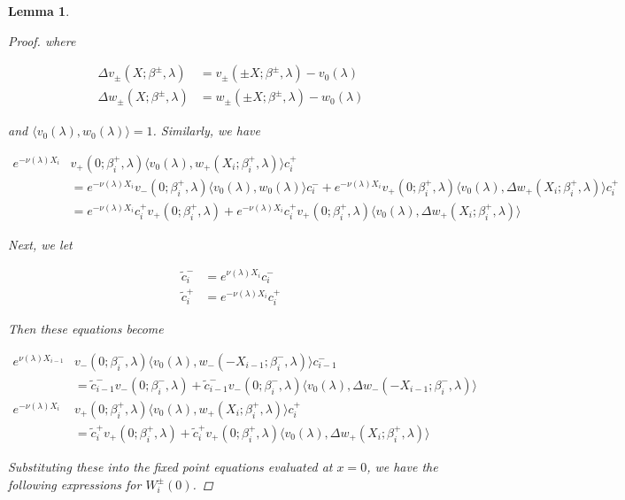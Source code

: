 \documentclass[12pt]{article}
\newtheorem{lemma}{Lemma}
\begin{document}
\begin{lemma}
\begin{proof}
where 

\begin{align*}
\Delta v_\pm(X; \beta^\pm, \lambda) &= v_\pm(\pm X; \beta^\pm, \lambda) - v_0(\lambda) \\
\Delta w_\pm(X; \beta^\pm, \lambda) &= w_\pm(\pm X; \beta^\pm, \lambda) - w_0(\lambda) 
\end{align*}

and $\langle v_0(\lambda), w_0(\lambda) \rangle = 1$. Similarly, we have

\begin{align*}
e^{-\nu(\lambda)X_i} &v_+(0; \beta_i^+, \lambda) \langle v_0(\lambda), w_+(X_i; \beta_i^+, \lambda) \rangle c_i^+ \\
&= e^{-\nu(\lambda)X_i} v_-(0; \beta_i^+, \lambda) \langle v_0(\lambda), w_0(\lambda) \rangle c_i^- + e^{-\nu(\lambda)X_i} v_+(0; \beta_i^+, \lambda) \langle v_0(\lambda), \Delta w_+(X_i; \beta_i^+, \lambda) \rangle c_i^+ \\
&= e^{-\nu(\lambda)X_i} c_i^+ v_+(0; \beta_i^+, \lambda) + e^{-\nu(\lambda)X_i} c_i^+ v_+(0; \beta_i^+, \lambda) \langle v_0(\lambda), \Delta w_+(X_i; \beta_i^+, \lambda) \rangle 
\end{align*}

Next, we let

\begin{align*}
\tilde{c}_i^- &= e^{\nu(\lambda)X_i} c_i^- \\
\tilde{c}_i^+ &= e^{-\nu(\lambda)X_i} c_i^+
\end{align*}

Then these equations become

\begin{align*}
e^{\nu(\lambda)X_{i-1}} &v_-(0; \beta_i^-, \lambda) \langle v_0(\lambda), w_-(-X_{i-1}; \beta_i^-, \lambda) \rangle c_{i-1}^- \\
&= \tilde{c}_{i-1}^- v_-(0; \beta_i^-, \lambda) + \tilde{c}_{i-1}^- v_-(0; \beta_i^-, \lambda) \langle v_0(\lambda), \Delta w_-(-X_{i-1}; \beta_i^-, \lambda) \rangle \\
e^{-\nu(\lambda)X_i} &v_+(0; \beta_i^+, \lambda) \langle v_0(\lambda), w_+(X_i; \beta_i^+, \lambda) \rangle c_i^+ \\
&= \tilde{c}_i^+ v_+(0; \beta_i^+, \lambda) + \tilde{c}_i^+ v_+(0; \beta_i^+, \lambda) \langle v_0(\lambda), \Delta w_+(X_i; \beta_i^+, \lambda) \rangle 
\end{align*}

Substituting these into the fixed point equations evaluated at $x = 0$, we have the following expressions for $W_i^\pm(0)$.


\end{proof}
\end{lemma}
\end{document}
